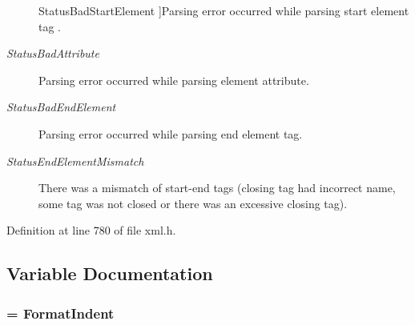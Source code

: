\begin{Desc}
\begin{description}
{\hypertarget{namespacephys_1_1xml_ae7aabb879b21c73d8183a54470f8917fadbc5b334b4215ce2332073de46c58155}{
StatusBadStartElement}
\label{d9/d27/namespacephys_1_1xml_ae7aabb879b21c73d8183a54470f8917fadbc5b334b4215ce2332073de46c58155}
}]Parsing error occurred while parsing start element tag . \item[{\em 
\hypertarget{namespacephys_1_1xml_ae7aabb879b21c73d8183a54470f8917fac5fdddc5cc4d127aa5c53efb85846ccf}{
StatusBadAttribute}
\label{d9/d27/namespacephys_1_1xml_ae7aabb879b21c73d8183a54470f8917fac5fdddc5cc4d127aa5c53efb85846ccf}
}]Parsing error occurred while parsing element attribute. \item[{\em 
\hypertarget{namespacephys_1_1xml_ae7aabb879b21c73d8183a54470f8917fa72532447020c081f343c4a719add7450}{
StatusBadEndElement}
\label{d9/d27/namespacephys_1_1xml_ae7aabb879b21c73d8183a54470f8917fa72532447020c081f343c4a719add7450}
}]Parsing error occurred while parsing end element tag. \item[{\em 
\hypertarget{namespacephys_1_1xml_ae7aabb879b21c73d8183a54470f8917fa6b8d817142e0898ad9b1c61cfa54b8ea}{
StatusEndElementMismatch}
\label{d9/d27/namespacephys_1_1xml_ae7aabb879b21c73d8183a54470f8917fa6b8d817142e0898ad9b1c61cfa54b8ea}
}]There was a mismatch of start-\/end tags (closing tag had incorrect name, some tag was not closed or there was an excessive closing tag). \end{description}
\end{Desc}



Definition at line 780 of file xml.h.



\subsection{Variable Documentation}
\hypertarget{namespacephys_1_1xml_a08bf6aab51f79929d9097706a5e64408}{
\subsubsection[{FormatDefault}]{ = {\bf FormatIndent}}}
\label{d9/d27/namespacephys_1_1xml_a08bf6aab51f79929d9097706a5e64408}


